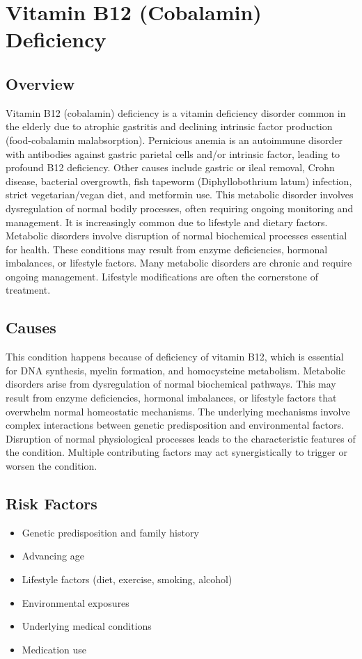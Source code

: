 \chapter{Vitamin B12 (Cobalamin) Deficiency}
\label{sec:Vitamin B12 Deficiency}

\section{Overview}
Vitamin B12 (cobalamin) deficiency is a vitamin deficiency disorder common in the elderly due to atrophic gastritis and declining intrinsic factor production (food-cobalamin malabsorption). Pernicious anemia is an autoimmune disorder with antibodies against gastric parietal cells and/or intrinsic factor, leading to profound B12 deficiency. Other causes include gastric or ileal removal, Crohn disease, bacterial overgrowth, fish tapeworm (Diphyllobothrium latum) infection, strict vegetarian/vegan diet, and metformin use. This metabolic disorder involves dysregulation of normal bodily processes, often requiring ongoing monitoring and management. It is increasingly common due to lifestyle and dietary factors. Metabolic disorders involve disruption of normal biochemical processes essential for health. These conditions may result from enzyme deficiencies, hormonal imbalances, or lifestyle factors. Many metabolic disorders are chronic and require ongoing management. Lifestyle modifications are often the cornerstone of treatment.
\section{Causes}
This condition happens because of deficiency of vitamin B12, which is essential for DNA synthesis, myelin formation, and homocysteine metabolism. Metabolic disorders arise from dysregulation of normal biochemical pathways. This may result from enzyme deficiencies, hormonal imbalances, or lifestyle factors that overwhelm normal homeostatic mechanisms. The underlying mechanisms involve complex interactions between genetic predisposition and environmental factors. Disruption of normal physiological processes leads to the characteristic features of the condition. Multiple contributing factors may act synergistically to trigger or worsen the condition.
\section{Risk Factors}
\begin{itemize}[noitemsep]
  \item Genetic predisposition and family history
  \item Advancing age
  \item Lifestyle factors (diet, exercise, smoking, alcohol)
  \item Environmental exposures
  \item Underlying medical conditions
  \item Medication use
\end{itemize}
